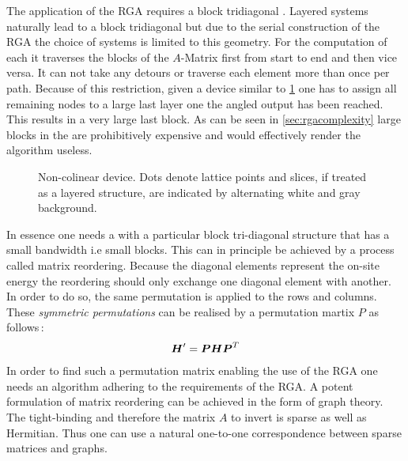 The application of the RGA requires a block tridiagonal \hamil{}. Layered systems naturally lead to a block tridiagonal \hamil{} but due to the serial construction of the RGA the choice of systems is limited to this geometry. For the computation of each \gfnc{} it traverses the blocks of the $A$-Matrix first from start to end and then vice versa. It can not take any detours or traverse each element more than once per path. Because of this restriction, given a device similar to \ref{fig:noncolinear} one has to assign all remaining nodes to a large last layer one the angled output has been reached. This results in a very large last block. As can be seen in \cref{sec:rgacomplexity} large blocks in the \hamil{} are prohibitively expensive and would effectively render the algorithm useless.
\begin{figure}[!ht]
\centering
{}
\caption{Non-colinear device. Dots denote lattice points and slices, if treated as a layered structure, are indicated by alternating white and gray background.}
\label{fig:noncolinear}
\end{figure}
In essence one needs a \hamil{} with a particular block tri-diagonal structure that has a small bandwidth i.e small blocks. This can in principle be achieved by a process called matrix reordering. Because the diagonal elements represent the on-site energy the reordering should only exchange one diagonal element with another. In order to do so, the same permutation is applied to the rows and columns. These \emph{symmetric permutations} can be realised by a permutation martix $P$ as follows\,\cite{saad2003iterative}:
\begin{align}
\boldsymbol{H}' = \boldsymbol{P} \boldsymbol{H} \boldsymbol{P}^{T}
\label{eqn:permutation}
\end{align}
In order to find such a permutation matrix enabling the use of the RGA one needs an algorithm adhering to the requirements of the RGA.
A potent formulation of matrix reordering can be achieved in the form of graph theory. The tight-binding \hamil{} and therefore the matrix $A$ to invert is sparse as well as Hermitian. Thus one can use a natural one-to-one correspondence between sparse matrices and graphs.
